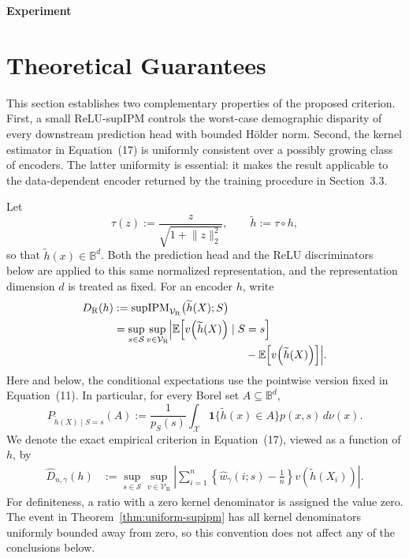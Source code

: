 \documentclass[10pt]{article}
\begin{document}
\begin{center}\vspace{-0.5em}
{\large\bfseries Experiment}
\vspace{-0.5em}\end{center}



\section{Theoretical Guarantees}
\label{sec:theoretical-guarantees}

This section establishes two complementary properties of the proposed
criterion.  First, a small ReLU-supIPM controls the worst-case demographic
disparity of every downstream prediction head with bounded H\"older norm.
Second, the kernel estimator in Equation~(17) is uniformly consistent over a
possibly growing class of encoders.  The latter uniformity is essential: it
makes the result applicable to the data-dependent encoder returned by the
training procedure in Section~3.3.

Let
\[
  \tau(z):=\frac{z}{\sqrt{1+\lVert z\rVert_2^2}},
  \qquad \widetilde h:=\tau\circ h,
\]
so that \(\widetilde h(x)\in\mathbb B^d\).  Both the prediction head and the
ReLU discriminators below are applied to this same normalized
representation, and the representation dimension \(d\) is treated as fixed.
For an encoder \(h\), write
\begin{align}
  D_{\mathrm R}(h)
  &:=%
  \operatorname{supIPM}_{\mathcal V_{\mathrm R}}
  \bigl(\widetilde h(X);S\bigr) \notag\\
  &=\sup_{s\in\mathcal S}\sup_{v\in\mathcal V_{\mathrm R}}
  \Bigl|
    \mathbb E\!\left[v\!\left(\widetilde h(X)\right)\mid S=s\right]
    \notag\\[-1mm]
  &\hspace{42mm}
    -\mathbb E\!\left[v\!\left(\widetilde h(X)\right)\right]
  \Bigr| .
  \label{eq:population-relu-supipm}
\end{align}
Here and below, the conditional expectations use the pointwise version fixed
in Equation~(11).  In particular, for every Borel set
\(A\subseteq\mathbb B^d\),
\[
  P_{\widetilde h(X)\mid S=s}(A)
  :=\frac{1}{p_S(s)}
    \int_{\mathcal X}
    \mathbf 1\{\widetilde h(x)\in A\}p(x,s)\,d\nu(x).
\]
We denote the exact empirical criterion in Equation~(17),
viewed as a function of \(h\), by
\begin{align}
  \widehat D_{n,\gamma}(h)
  &:=%
  \sup_{s\in\mathcal S}\sup_{v\in\mathcal V_{\mathrm R}}
  \left|
    \sum_{i=1}^n
    \left\{\widehat w_\gamma(i;s)-\frac1n\right\}
    v\!\left(\widetilde h(X_i)\right)
  \right| .
  \label{eq:empirical-relu-supipm-theory}
\end{align}
For definiteness, a ratio with a zero kernel denominator is assigned the
value zero.  The event in Theorem~\ref{thm:uniform-supipm} has all kernel
denominators uniformly bounded away from zero, so this convention does not
affect any of the conclusions below.
\end{document}
